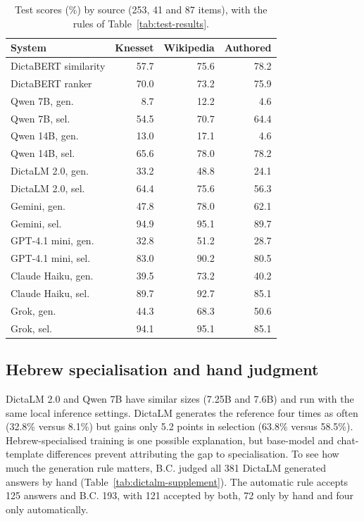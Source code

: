\begin{table}[t]
\centering\small
\setlength{\tabcolsep}{3pt}
\begin{tabular}{@{}lrrr@{}}
\toprule
System & Knesset & Wikipedia & Authored \\
\midrule
DictaBERT similarity & 57.7 & 75.6 & 78.2 \\
DictaBERT ranker & 70.0 & 73.2 & 75.9 \\
\midrule
Qwen 7B, gen. & 8.7 & 12.2 & 4.6 \\
Qwen 7B, sel. & 54.5 & 70.7 & 64.4 \\
Qwen 14B, gen. & 13.0 & 17.1 & 4.6 \\
Qwen 14B, sel. & 65.6 & 78.0 & 78.2 \\
DictaLM 2.0, gen. & 33.2 & 48.8 & 24.1 \\
DictaLM 2.0, sel. & 64.4 & 75.6 & 56.3 \\
Gemini, gen. & 47.8 & 78.0 & 62.1 \\
Gemini, sel. & 94.9 & 95.1 & 89.7 \\
GPT-4.1 mini, gen. & 32.8 & 51.2 & 28.7 \\
GPT-4.1 mini, sel. & 83.0 & 90.2 & 80.5 \\
Claude Haiku, gen. & 39.5 & 73.2 & 40.2 \\
Claude Haiku, sel. & 89.7 & 92.7 & 85.1 \\
Grok, gen. & 44.3 & 68.3 & 50.6 \\
Grok, sel. & 94.1 & 95.1 & 85.1 \\
\bottomrule
\end{tabular}
\caption{Test scores (\%) by source (253, 41 and 87 items), with the rules of Table~\ref{tab:test-results}.}
\label{tab:res-source}
\end{table}

\subsection{Hebrew specialisation and hand judgment}
\label{sec:res-measurement}
DictaLM 2.0 and Qwen 7B have similar sizes (7.25B and 7.6B) and run with the same local inference settings. DictaLM generates the reference four times as often (32.8\% versus 8.1\%) but gains only 5.2 points in selection (63.8\% versus 58.5\%). Hebrew-specialised training is one possible explanation, but base-model and chat-template differences prevent attributing the gap to specialisation. To see how much the generation rule matters, B.C. judged all 381 DictaLM generated answers by hand (Table~\ref{tab:dictalm-supplement}). The automatic rule accepts 125 answers and B.C. 193, with 121 accepted by both, 72 only by hand and four only automatically.

